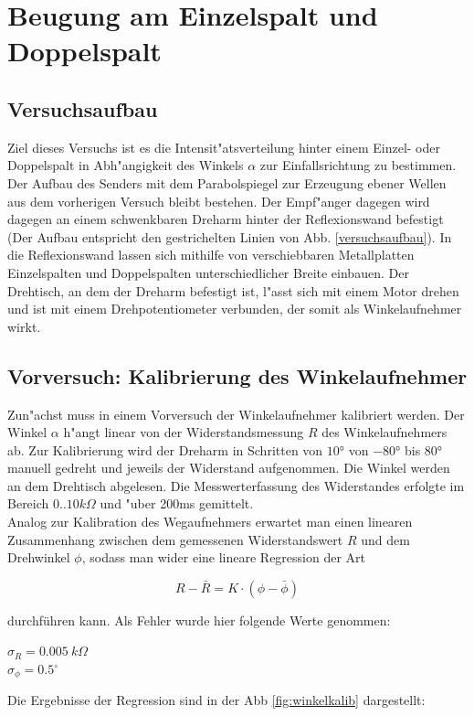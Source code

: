 \documentclass[12pt,a4paper]{article}
\begin{document}
\section{Beugung am Einzelspalt und Doppelspalt}

\subsection{Versuchsaufbau}
Ziel dieses Versuchs ist es die Intensit"atsverteilung hinter einem Einzel- oder Doppelspalt in Abh"angigkeit des Winkels $\alpha$ zur Einfallsrichtung zu bestimmen. Der Aufbau des Senders mit dem Parabolspiegel zur Erzeugung ebener Wellen aus dem vorherigen Versuch bleibt bestehen. Der Empf"anger dagegen wird dagegen an einem schwenkbaren Dreharm hinter der Reflexionswand befestigt (Der Aufbau entspricht den gestrichelten Linien von Abb. \ref{versuchsaufbau}). In die Reflexionswand lassen sich mithilfe von verschiebbaren Metallplatten Einzelspalten und Doppelspalten unterschiedlicher Breite einbauen. Der Drehtisch, an dem der Dreharm befestigt ist, l"asst sich mit einem Motor drehen und ist mit einem Drehpotentiometer verbunden, der somit als Winkelaufnehmer wirkt. 

\subsection{Vorversuch: Kalibrierung des Winkelaufnehmer}
Zun"achst muss in einem Vorversuch der Winkelaufnehmer kalibriert werden. Der Winkel $\alpha$ h"angt linear von der Widerstandsmessung $R$ des Winkelaufnehmers ab. Zur Kalibrierung wird der Dreharm in Schritten von $\ang{10}$ von $\ang{-80}$ bis $\ang{80}$ manuell gedreht und jeweils der Widerstand aufgenommen. Die Winkel werden an dem Drehtisch abgelesen. Die Messwerterfassung des Widerstandes erfolgte im Bereich $0..10k\Omega$ und "uber 200ms gemittelt.\\
Analog zur Kalibration des Wegaufnehmers erwartet man einen linearen Zusammenhang zwischen dem gemessenen Widerstandswert $R$ und dem Drehwinkel $\phi$, sodass man wider eine lineare Regression der Art

\begin{equation}
	R-\bar{R}=K\cdot(\phi-\bar{\phi})
\end{equation}

durchführen kann. Als Fehler wurde hier folgende Werte genommen:
\begin{center}
	$\sigma_R = \SI{0.005}{k \Omega}$\\
	$\sigma_{\phi} = 0.5^\circ$
\end{center}
Die Ergebnisse der Regression sind in der Abb \ref{fig:winkelkalib} dargestellt:
\end{document}
